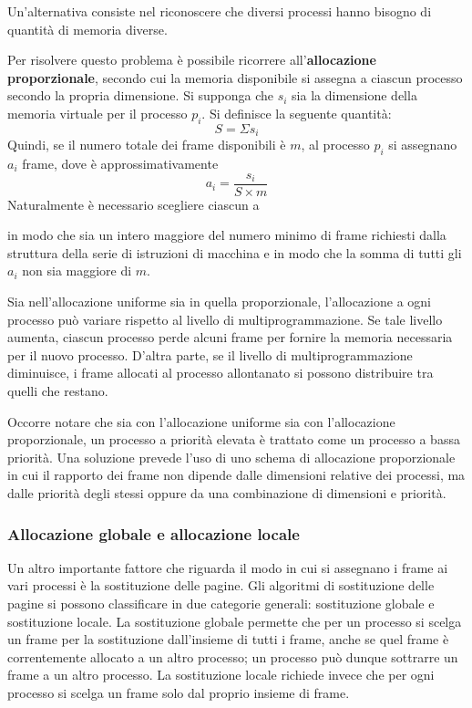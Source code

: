 \documentclass[11pt,a4paper]{article}
\begin{document}
Un'alternativa consiste nel riconoscere che diversi processi hanno bisogno di quantità
di memoria diverse.

Per risolvere questo problema è possibile ricorrere all'\textbf{allocazione proporzionale}, se­condo cui la memoria disponibile si assegna a ciascun processo secondo la propria dimen­sione. Si supponga che $s_i$ sia la dimensione della memoria virtuale per il processo $p_i$. Si definisce la seguente quantità:
\[ S=\Sigma s_i \]
Quindi, se il numero totale dei frame disponibili è $m$, al processo $p_i$ si assegnano $a_i$ frame,
dove è approssimativamente
\[ a_i = \frac{s_i}{S \times m} \]
Naturalmente è necessario scegliere ciascun a{ in modo che sia un intero maggiore del nu­mero minimo di frame richiesti dalla struttura della serie di istruzioni di macchina e in mo­do che la somma di tutti gli $a_i$ non sia maggiore di $m$.


Sia nell'allocazione uniforme sia in quella proporzionale, l'allocazione a ogni processo
può variare rispetto al livello di multiprogrammazione. Se tale livello aumenta, ciascun processo perde alcuni frame per fornire la memoria necessaria per il nuovo processo. D'altra
parte, se il livello di multiprogrammazione diminuisce, i frame allocati al processo allonta­nato si possono distribuire tra quelli che restano.

Occorre notare che sia con l'allocazione uniforme sia con l'allocazione proporzionale,
un processo a priorità elevata è trattato come un processo a bassa priorità. Una soluzione prevede l'uso di uno schema di allocazione proporzionale in cui il rapporto dei frame non dipende dalle di­mensioni relative dei processi, ma dalle priorità degli stessi oppure da una combinazione di
dimensioni e priorità.

\subsubsection{Allocazione globale e allocazione locale}
Un altro importante fattore che riguarda il modo in cui si assegnano i frame ai vari processi
è la sostituzione delle pagine.
Gli algoritmi di sostituzione delle pagine si possono classificare in due categorie gene­rali: sostituzione globale e sostituzione locale. La sostituzione globale permette che per un
processo si scelga un frame per la sostituzione dall'insieme di tutti i frame, anche se quel
frame è correntemente allocato a un altro processo; un processo può dunque sottrarre un
frame a un altro processo. La sostituzione locale richiede invece che per ogni processo si scelga un frame solo dal proprio insieme di frame.

}
\end{document}
